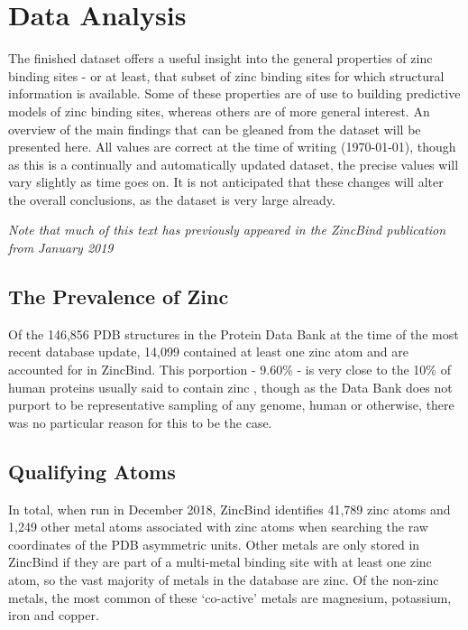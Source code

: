 \section{Data Analysis}

The finished dataset offers a useful insight into the general properties of zinc binding sites - or at least, that subset of zinc binding sites for which structural information is available. Some of these properties are of use to building predictive models of zinc binding sites, whereas others are of more general interest. An overview of the main findings that can be gleaned from the dataset will be presented here. All values are correct at the time of writing ({\today}), though as this is a continually and automatically updated dataset, the precise values will vary slightly as time goes on. It is not anticipated that these changes will alter the overall conclusions, as the dataset is very large already.

\emph{Note that much of this text has previously appeared in the ZincBind publication from January 2019}

\subsection{The Prevalence of Zinc}

Of the 146,856 PDB structures in the Protein Data Bank at the time of the most recent database update, 14,099 contained at least one zinc atom and are accounted for in ZincBind. This porportion - 9.60\% - is very close to the 10\% of human proteins usually said to contain zinc , though as the Data Bank does not purport to be representative sampling of any genome, human or otherwise, there was no particular reason for this to be the case.

\subsection{Qualifying Atoms}

In total, when run in December 2018, ZincBind identifies 41,789 zinc atoms and 1,249 other metal atoms associated with zinc atoms when searching the raw coordinates of the PDB asymmetric units. Other metals are only stored in ZincBind if they are part of a multi-metal binding site with at least one zinc atom, so the vast majority of metals in the database are zinc. Of the non-zinc metals, the most common of these `co-active' metals are magnesium, potassium, iron and copper.

